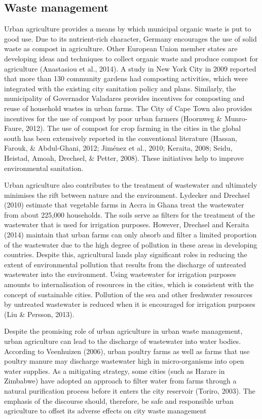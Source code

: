 \subsection{Waste management}

Urban agriculture provides a means by which municipal organic waste is put to good use. Due to its nutrient-rich character, Germany encourages the use of solid waste as compost in agriculture. Other European Union member states are developing ideas and techniques to collect organic waste and produce compost for agriculture (Anastasiou et al., 2014). A study in New York City in 2009 reported that more than 130 community gardens had composting activities, which were integrated with the existing city sanitation policy and plans. Similarly, the municipality of Governador Valadares provides incentives for composting and reuse of household wastes in urban farms. The City of Cape Town also provides incentives for the use of compost by poor urban farmers (Hoornweg \& Munro-Faure, 2012). The use of compost for crop farming in the cities in the global south has been extensively reported in the conventional literature (Hassan, Farouk, \& Abdul-Ghani, 2012; Jiménez et al., 2010; Keraita, 2008; Seidu, Heistad, Amoah, Drechsel, \& Petter, 2008). These initiatives help to improve environmental sanitation.

Urban agriculture also contributes to the treatment of wastewater and ultimately minimises the rift between nature and the environment. Lydecker and Drechsel (2010) estimate that vegetable farms in Accra in Ghana treat the wastewater from about 225,000 households. The soils serve as filters for the treatment of the wastewater that is used for irrigation purposes. However, Drechsel and Keraita (2014) maintain that urban farms can only absorb and filter a limited proportion of the wastewater due to the high degree of pollution in these areas in developing countries. Despite this, agricultural lands play significant roles in reducing the extent of environmental pollution that results from the discharge of untreated wastewater into the environment. Using wastewater for irrigation purposes amounts to internalisation of resources in the cities, which is consistent with the concept of sustainable cities. Pollution of the sea and other freshwater resources by untreated wastewater is reduced when it is encouraged for irrigation purposes (Liu \& Persson, 2013).

Despite the promising role of urban agriculture in urban waste management, urban agriculture can lead to the discharge of wastewater into water bodies. According to Veenhuizen (2006), urban poultry farms as well as farms that use poultry manure may discharge wastewater high in micro-organisms into open water supplies. As a mitigating strategy, some cities (such as Harare in Zimbabwe) have adopted an approach to filter water from farms through a natural purification process before it enters the city reservoir (Toriro, 2003). The emphasis of the discourse should, therefore, be safe and responsible urban agriculture to offset its adverse effects on city waste management

